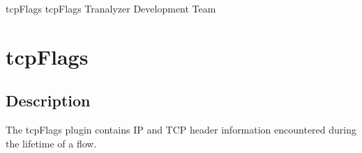 \documentclass[documentation]{subfiles}
\begin{document}
\trantitle
    {tcpFlags}
    {tcpFlags}
    {Tranalyzer Development Team} %

\section{tcpFlags}\label{s:tcpFlags}

\subsection{Description}
The tcpFlags plugin contains IP and TCP header information encountered during the lifetime of a flow.

%
%
%
\end{document}
